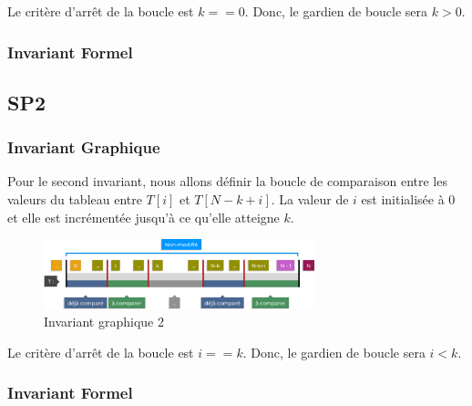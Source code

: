 Le critère d'arrêt de la boucle est $k ==0$. Donc, le gardien de boucle sera
$k > 0$.

\subsubsection{Invariant Formel}

\begin{center}
\end{center}

\subsection{SP2}
\subsubsection{Invariant Graphique}
Pour le second invariant, nous allons définir la boucle de comparaison entre les
valeurs du tableau entre $T[i]$ et $T[N-k+i]$. La valeur de $i$ est initialisée 
à 0 et elle est incrémentée jusqu'à ce qu'elle atteigne $k$.

\begin{figure}[h]
   \centering
   \includegraphics[width=0.7\textwidth]{sp2.pdf}
   \caption{Invariant graphique 2}
   \label{fig:invariant2}
\end{figure}

Le critère d'arrêt de la boucle est $i == k$. Donc, le gardien de boucle sera
$i < k$.
\subsubsection{Invariant Formel}

